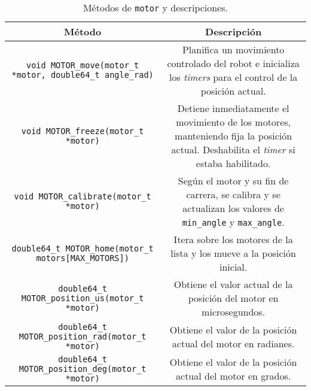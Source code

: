 \begin{longtable}{C{1} | C{0.5}}
    \caption{Métodos de \texttt{motor} y descripciones.}
    \label{tab:motors_def}
    \endfirsthead
    \endhead
    \hline
    \textbf{Método} & \textbf{Descripción} \\
    \hline
    \lstinline[style=C]!void MOTOR_move(motor_t *motor, double64_t angle_rad)! & Planifica un movimiento controlado del robot e inicializa los \textit{timers} para el control de la posición actual. \\
    \hline
    \lstinline[style=C]!void MOTOR_freeze(motor_t *motor)! & Detiene inmediatamente el movimiento de los motores, manteniendo fija la posición actual. Deshabilita el \textit{timer} si estaba habilitado. \\
    \hline
    \lstinline[style=C]!void MOTOR_calibrate(motor_t *motor)! & Según el motor y su fin de carrera, se calibra y se actualizan los valores de \texttt{min\_angle} y \texttt{max\_angle}. \\
    \hline
    \lstinline[style=C]!double64_t MOTOR_home(motor_t motors[MAX_MOTORS])! & Itera sobre los motores de la lista y los mueve a la posición inicial. \\
    \hline
    \lstinline[style=C]!double64_t MOTOR_position_us(motor_t *motor)! & Obtiene el valor actual de la posición del motor en microsegundos. \\
    \hline
    \lstinline[style=C]!double64_t MOTOR_position_rad(motor_t *motor)! & Obtiene el valor de la posición actual del motor en radianes. \\
    \hline
    \lstinline[style=C]!double64_t MOTOR_position_deg(motor_t *motor)! & Obtiene el valor de la posición actual del motor en grados.
\end{longtable}